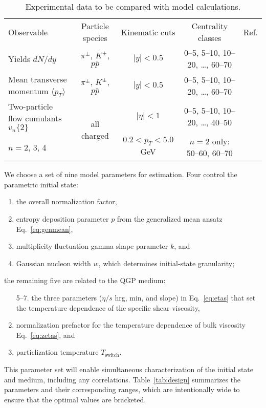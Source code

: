 \documentclass[aps,prc,reprint,amsmath,nofootinbib,superscriptaddress]{revtex4-1}
\newcommand{\avg}[1]{\langle #1 \rangle}
\newcommand{\vnk}[2]{v_#1\{#2\}}
\newcommand{\paddedhline}{\noalign{\smallskip}\hline\noalign{\smallskip}}
\begin{document}
\begin{table*}
  \caption{
    \label{tab:observables}
    Experimental data to be compared with model calculations.
  }
  \begin{ruledtabular}
  \begin{tabular}{lcccc}
    Observable & Particle species & Kinematic cuts & Centrality classes & Ref. \\
    \paddedhline
    Yields $dN/dy$                       & $\pi^\pm$, $K^\pm$, $p\bar p$ &
    $|y| < 0.5$ & 0--5, 5--10, 10--20, \ldots, 60--70 & \cite{Abelev:2013vea} \\
    \noalign{\smallskip}
    Mean transverse momentum $\avg{p_T}$ & $\pi^\pm$, $K^\pm$, $p\bar p$ &
    $|y| < 0.5$ & 0--5, 5--10, 10--20, \ldots, 60--70 & \cite{Abelev:2013vea} \\
    \noalign{\smallskip}
    Two-particle flow cumulants $\vnk n 2$ & \multirow{2}{*}{all charged} &
    $|\eta| < 1$ & 0--5, 5--10, 10--20, \ldots, 40--50 &
    \multirow{2}{*}{\cite{ALICE:2011ab}} \\
    $n = 2$, 3, 4 & & $0.2 < p_T < 5.0$ GeV & $n = 2$ only: 50--60, 60--70 & \\
  \end{tabular}
  \end{ruledtabular}
\end{table*}

We choose a set of nine model parameters for estimation.
Four control the parametric initial state:
\begin{enumerate}
  \item the overall normalization factor,
  \item entropy deposition parameter $p$ from the generalized mean ansatz Eq.~\eqref{eq:genmean},
  \item multiplicity fluctuation gamma shape parameter $k$, and
  \item Gaussian nucleon width $w$, which determines initial-state granularity;
\end{enumerate}
the remaining five are related to the QGP medium:
\begin{enumerate}
  \item[5--7.] the three parameters ($\eta/s$ hrg, min, and slope) in Eq.~\eqref{eq:etas} that set the temperature dependence of the specific shear viscosity,
  \setcounter{enumi}{7}
  \item normalization prefactor for the temperature dependence of bulk viscosity Eq.~\eqref{eq:zetas}, and
  \item particlization temperature $T_\text{switch}$.
\end{enumerate}
This parameter set will enable simultaneous characterization of the initial state and medium, including any correlations.
Table~\ref{tab:design} summarizes the parameters and their corresponding ranges, which are intentionally wide to ensure that the optimal values are bracketed.
\end{document}
